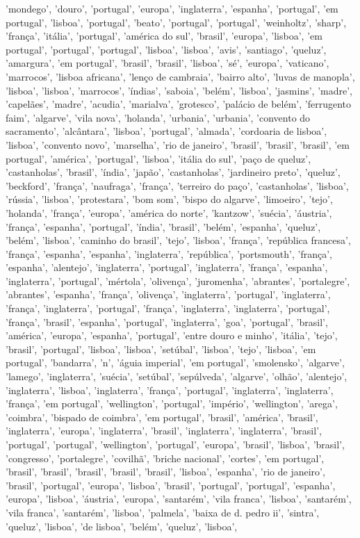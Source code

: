 \documentclass{article}
\begin{document}
\begin{itemize}
'mondego', 'douro', 'portugal', 'europa', 'inglaterra', 'espanha', 'portugal', 'em portugal', 'lisboa', 'portugal', 'beato', 'portugal', 'portugal', 'weinholtz', 'sharp', 'frança', 'itália', 'portugal', 'américa do sul', 'brasil', 'europa', 'lisboa', 'em portugal', 'portugal', 'portugal', 'lisboa', 'lisboa', 'avis', 'santiago', 'queluz', 'amargura', 'em portugal', 'brasil', 'brasil', 'lisboa', 'sé', 'europa', 'vaticano', 'marrocos', 'lisboa africana', 'lenço de cambraia', 'bairro alto', 'luvas de manopla', 'lisboa', 'lisboa', 'marrocos', 'índias', 'saboia', 'belém', 'lisboa', 'jasmins', 'madre', 'capelães', 'madre', 'acudia', 'marialva', 'grotesco', 'palácio de belém', 'ferrugento faim', 'algarve', 'vila nova', 'holanda', 'urbania', 'urbania', 'convento do sacramento', 'alcântara', 'lisboa', 'portugal', 'almada', 'cordoaria de lisboa', 'lisboa', 'convento novo', 'marselha', 'rio de janeiro', 'brasil', 'brasil', 'brasil', 'em portugal', 'américa', 'portugal', 'lisboa', 'itália do sul', 'paço de queluz', 'castanholas', 'brasil', 'índia', 'japão', 'castanholas', 'jardineiro preto', 'queluz', 'beckford', 'frança', 'naufraga', 'frança', 'terreiro do paço', 'castanholas', 'lisboa', 'rússia', 'lisboa', 'protestara', 'bom som', 'bispo do algarve', 'limoeiro', 'tejo', 'holanda', 'frança', 'europa', 'américa do norte', 'kantzow', 'suécia', 'áustria', 'frança', 'espanha', 'portugal', 'índia', 'brasil', 'belém', 'espanha', 'queluz', 'belém', 'lisboa', 'caminho do brasil', 'tejo', 'lisboa', 'frança', 'república francesa', 'frança', 'espanha', 'espanha', 'inglaterra', 'república', 'portsmouth', 'frança', 'espanha', 'alentejo', 'inglaterra', 'portugal', 'inglaterra', 'frança', 'espanha', 'inglaterra', 'portugal', 'mértola', 'olivença', 'juromenha', 'abrantes', 'portalegre', 'abrantes', 'espanha', 'frança', 'olivença', 'inglaterra', 'portugal', 'inglaterra', 'frança', 'inglaterra', 'portugal', 'frança', 'inglaterra', 'inglaterra', 'portugal', 'frança', 'brasil', 'espanha', 'portugal', 'inglaterra', 'goa', 'portugal', 'brasil', 'américa', 'europa', 'espanha', 'portugal', 'entre douro e minho', 'itália', 'tejo', 'brasil', 'portugal', 'lisboa', 'lisboa', 'setúbal', 'lisboa', 'tejo', 'lisboa', 'em portugal', 'bandarra', 'n', 'águia imperial', 'em portugal', 'smolensko', 'algarve', 'lamego', 'inglaterra', 'suécia', 'setúbal', 'sepúlveda', 'algarve', 'olhão', 'alentejo', 'inglaterra', 'lisboa', 'inglaterra', 'frança', 'portugal', 'inglaterra', 'inglaterra', 'frança', 'em portugal', 'wellington', 'portugal', 'império', 'wellington', 'arega', 'coimbra', 'bispado de coimbra', 'em portugal', 'brasil', 'américa', 'brasil', 'inglaterra', 'europa', 'inglaterra', 'brasil', 'inglaterra', 'inglaterra', 'brasil', 'portugal', 'portugal', 'wellington', 'portugal', 'europa', 'brasil', 'lisboa', 'brasil', 'congresso', 'portalegre', 'covilhã', 'briche nacional', 'cortes', 'em portugal', 'brasil', 'brasil', 'brasil', 'brasil', 'brasil', 'lisboa', 'espanha', 'rio de janeiro', 'brasil', 'portugal', 'europa', 'lisboa', 'brasil', 'portugal', 'portugal', 'espanha', 'europa', 'lisboa', 'áustria', 'europa', 'santarém', 'vila franca', 'lisboa', 'santarém', 'vila franca', 'santarém', 'lisboa', 'palmela', 'baixa de d. pedro ii', 'sintra', 'queluz', 'lisboa', 'de lisboa', 'belém', 'queluz', 'lisboa', 
\end{itemize}
\end{document}
